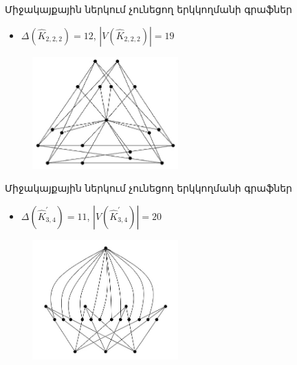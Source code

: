 \begin{frame}{Միջակայքային ներկում չունեցող երկկողմանի գրաֆներ}
\begin{itemize}
	\item $\Delta(\widehat{K}_{2,2,2})=12$, $|V(\widehat{K}_{2,2,2})|=19$
\end{itemize}

\begin{figure}[h]
\begin{center}
\includegraphics[width=0.5\textwidth]{figures/K222.eps}
\end{center}
\end{figure}
\end{frame}

\begin{frame}{Միջակայքային ներկում չունեցող երկկողմանի գրաֆներ}
\begin{itemize}
	\item $\Delta(\widehat{K}_{3,4}^{\prime})=11$, $|V(\widehat{K}_{3,4}^{\prime})|=20$
\end{itemize}

\begin{figure}[h]
\begin{center}
\includegraphics[width=0.5\textwidth]{figures/K34-prime.jpg}
\end{center}
\end{figure}
\end{frame}


